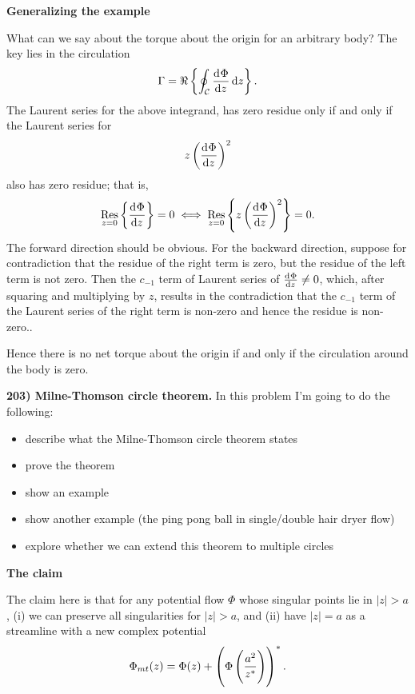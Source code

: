 \documentclass{article}
\DeclareMathOperator*{\res}{Res}
\newcommand{\fC}{\mathcal{C}} %
\begin{document}
\textbf{Generalizing the example}

What can we say about the torque about the origin for an arbitrary body?
The key lies in the circulation
%
\begin{equation*}
    \Gamma = \Re \cbr{\oint_\fC \dod{\Phi}{z} \dif z}
    .
\end{equation*}
%
The Laurent series for the above integrand, has zero residue only if
and only if the Laurent series for
%
\begin{equation*}
    z \del{\dod{\Phi}{z}}^2
\end{equation*}
%
also has zero residue; that is,
%
\begin{equation*}
    \res_{z = 0} \cbr{\dod{\Phi}{z}} = 0 \iff
    \res_{z = 0} \cbr{z \del{\dod{\Phi}{z}}^2} = 0
    .
\end{equation*}
%
The forward direction should be obvious. For the backward direction,
suppose for contradiction that the residue of the right term is zero,
but the residue of the left term is not zero. Then the $c_{-1}$ term of
Laurent series of $\od{\Phi}{z} \neq 0$, which, after squaring and
multiplying by $z$, results in the contradiction that the $c_{-1}$ term
of the Laurent series of the right term is non-zero and hence the
residue is non-zero..

Hence there is no net torque about the origin if and only if the
circulation around the body is zero.

\newpage

\textbf{203) Milne-Thomson circle theorem.}
In this problem I'm going to do the following:
%
\begin{itemize}
    \item describe what the Milne-Thomson circle theorem states
    \item prove the theorem
    \item show an example
    \item show another example (the ping pong ball in single/double hair dryer flow)
    \item explore whether we can extend this theorem to multiple circles
\end{itemize}

\textbf{The claim}

The claim here is that for any potential flow $\Phi$ whose singular
points lie in $|z| > a$, (i) we can preserve all singularities for $|z|
> a$, and (ii) have $|z| = a$ as a streamline with a new complex
potential
%
\begin{equation*}
    \Phi_{mt}(z) = \Phi(z) + \del{\Phi \del{\frac{a^2}{z^*}}}^*
    .
\end{equation*}
\end{document}
